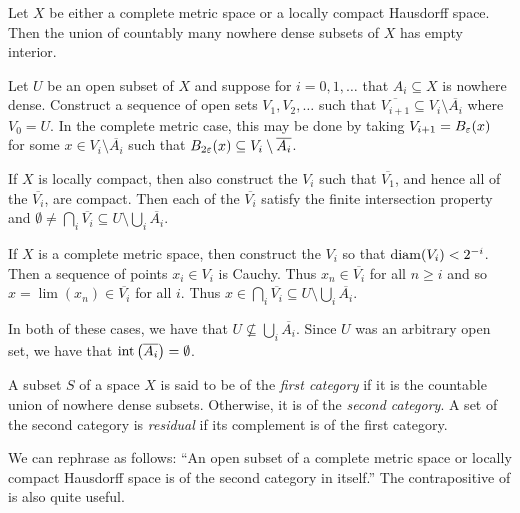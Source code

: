 \documentclass[letterpaper, 11pt, oneside]{book}
\begin{document}
\begin{thrm}\label{thrm: baire_category}
  Let $X$ be either a complete metric space or a locally compact Hausdorff space.
  Then the union of countably many nowhere dense subsets of $X$ has empty interior.
\end{thrm}
\begin{pf}
  Let $U$ be an open subset of $X$ and suppose for $i = 0, 1, \ldots$ that $A_{i} \subseteq X$ is nowhere dense.
  Construct a sequence of open sets $V_{1}, V_{2}, \ldots$ such that $\overline{V_{i + 1}} \subseteq V_{i} \setminus \overline{A_{i}}$ where $V_{0} = U$.
  In the complete metric case, this may be done by taking $V_{i + 1} = B_{\varepsilon}(x)$ for some $x \in V_{i} \setminus \overline{A_{i}}$ such that $B_{2\varepsilon}(x) \subseteq V_{i} \setminus \overline{A_{i}}$.

  If $X$ is locally compact, then also construct the $V_{i}$ such that $\overline{V_{1}}$, and hence all of the $\overline{V_{i}}$, are compact.
  Then each of the $\overline{V_{i}}$ satisfy the finite intersection property and $\emptyset \neq \bigcap_{i} \overline{V_{i}} \subseteq U \setminus \bigcup_{i} \overline{A_{i}}$.

  If $X$ is a complete metric space, then construct the $V_{i}$ so that $\operatorname{diam}(V_{i}) < 2^{-i}$.
  Then a sequence of points $x_{i} \in V_{i}$ is Cauchy.
  Thus $x_{n} \in \overline{V_{i}}$ for all $n \geq i$ and so $x = \lim(x_{n}) \in \overline{V_{i}}$ for all $i$.
  Thus $x \in \bigcap_{i} \overline{V_{i}} \subseteq U \setminus \bigcup_{i} \overline{A_{i}}$.

  In both of these cases, we have that $U \not\subseteq \bigcup_{i} \overline{A_{i}}$.
  Since $U$ was an arbitrary open set, we have that $\inte\pqty{\overline{A_{i}}} = \emptyset$.
\end{pf}

\begin{defn}
  A subset $S$ of a space $X$ is said to be of the \emph{first category} if it is the countable union of nowhere dense subsets.
  Otherwise, it is of the \emph{second category}.
  A set of the second category is \emph{residual} if its complement is of the first category.
\end{defn}

\clearpage

We can rephrase  as follows: ``An open subset of a complete metric space or locally compact Hausdorff space is of the second category in itself.''
The contrapositive of  is also quite useful.
\end{document}
